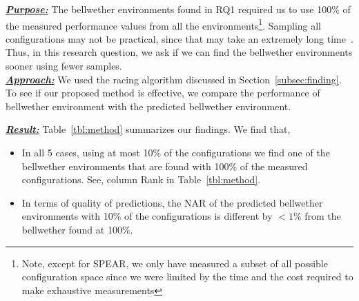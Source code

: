 \documentclass[10pt,journal,compsoc]{IEEEtran}
\newcommand{\be}{\begin{enumerate}}
\newcommand{\ee}{\end{enumerate}}
\begin{document}
\noindent\textbf{\textit{\underline{Purpose:}}} The bellwether environments found in RQ1 required us to use 100\% of the measured performance values from all the environments\footnote{Note, except for SPEAR, we only have measured a subset of all possible configuration space since we were limited by the time and the cost required to make exhaustive measurements}. Sampling all configurations may not be practical, since that may take an extremely long time~\cite{jamshidi2017transfer2}. %
Thus, in this research question, we ask if we can find the bellwether environments sooner using fewer samples. \\
\textbf{\textit{\underline{Approach:}}}
We used the racing algorithm discussed in Section~\ref{subsec:finding}. To see if our proposed method is effective, we compare the performance of bellwether environment with the predicted bellwether environment.


\noindent\textbf{\textit{\underline{Result:}}}
Table~\ref{tbl:method} summarizes our findings. We find that, 
\begin{itemize}[leftmargin=*]
    \item In all 5 cases, using at most 10\% of the configurations we find one of the bellwether environments that are found with 100\% of the measured configurations. See, column Rank in Table~\ref{tbl:method}. 
    \item In terms of quality of predictions, the NAR of the predicted bellwether environments with 10\% of the configurations is different by $<1\%$ from the bellwether found at 100\%.
\end{itemize}
\end{document}
